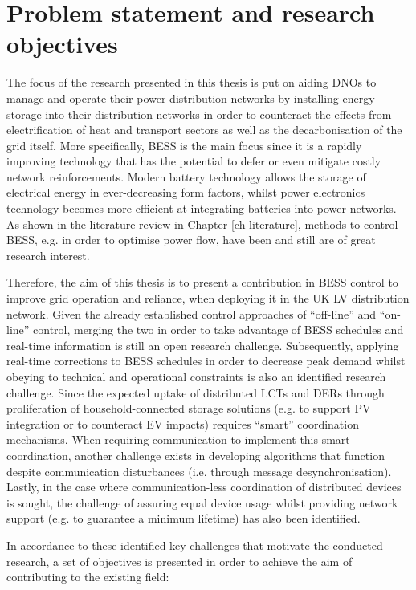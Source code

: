 \section{Problem statement and research objectives}
\label{ch-introduction:sec:problem-statement}

The focus of the research presented in this thesis is put on aiding DNOs to manage and operate their power distribution networks by installing energy storage into their distribution networks in order to counteract the effects from electrification of heat and transport sectors as well as the decarbonisation of the grid itself.
More specifically, BESS is the main focus since it is a rapidly improving technology that has the potential to defer or even mitigate costly network reinforcements.
Modern battery technology allows the storage of electrical energy in ever-decreasing form factors, whilst power electronics technology becomes more efficient at integrating batteries into power networks.
As shown in the literature review in Chapter \ref{ch-literature}, methods to control BESS, e.g. in order to optimise power flow, have been and still are of great research interest.

Therefore, the aim of this thesis is to present a contribution in BESS control to improve grid operation and reliance, when deploying it in the UK LV distribution network.
Given the already established control approaches of ``off-line'' and ``on-line'' control, merging the two in order to take advantage of BESS schedules and real-time information is still an open research challenge.
Subsequently, applying real-time corrections to BESS schedules in order to decrease peak demand whilst obeying to technical and operational constraints is also an identified research challenge.
Since the expected uptake of distributed LCTs and DERs through proliferation of household-connected storage solutions (e.g. to support PV integration or to counteract EV impacts) requires ``smart'' coordination mechanisms.
When requiring communication to implement this smart coordination, another challenge exists in developing algorithms that function despite communication disturbances (i.e. through message desynchronisation).
Lastly, in the case where communication-less coordination of distributed devices is sought, the challenge of assuring equal device usage whilst providing network support (e.g. to guarantee a minimum lifetime) has also been identified.

In accordance to these identified key challenges that motivate the conducted research, a set of objectives is presented in order to achieve the aim of contributing to the existing field:

